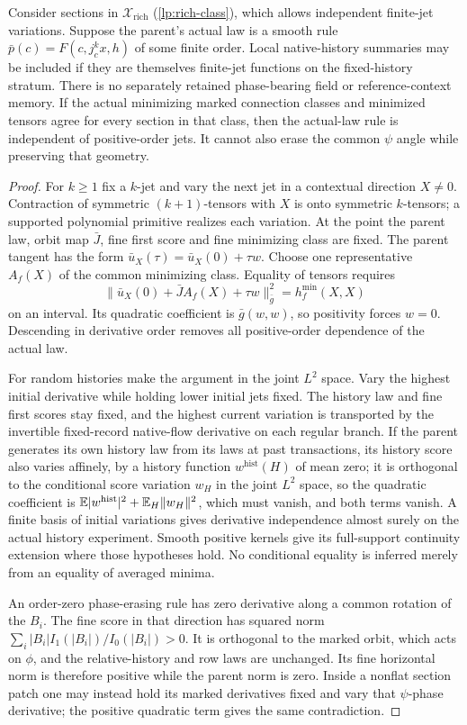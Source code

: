 Consider sections in $\mathcal X_{\mathrm{rich}}$ (\cref{lp:rich-class}), which allows independent finite-jet variations. Suppose the parent's actual law is a smooth rule $\bar p(c)=F(c,j_c^k x,h)$ of some finite order. Local native-history summaries may be included if they are themselves finite-jet functions on the fixed-history stratum. There is no separately retained phase-bearing field or reference-context memory. If the actual minimizing marked connection classes and minimized tensors agree for every section in that class, then the actual-law rule is independent of positive-order jets. It cannot also erase the common $\psi$ angle while preserving that geometry.
\begin{proof}
For $k\ge1$ fix a $k$-jet and vary the next jet in a contextual direction $X\ne0$. Contraction of symmetric $(k+1)$-tensors with $X$ is onto symmetric $k$-tensors; a supported polynomial primitive realizes each variation. At the point the parent law, orbit map $\bar J$, fine first score and fine minimizing class are fixed. The parent tangent has the form $\bar u_X(\tau)=\bar u_X(0)+\tau w$. Choose one representative $A_f(X)$ of the common minimizing class. Equality of tensors requires
\begin{equation}
 \|\bar u_X(0)+\bar J A_f(X)+\tau w\|_{\bar g}^2
 =h_f^{\min}(X,X)
 \label{lp:highest-jet}
\end{equation}
on an interval. Its quadratic coefficient is $\bar g(w,w)$, so positivity forces $w=0$. Descending in derivative order removes all positive-order dependence of the actual law.

For random histories make the argument in the joint $L^2$ space. Vary the highest initial derivative while holding lower initial jets fixed. The history law and fine first scores stay fixed, and the highest current variation is transported by the invertible fixed-record native-flow derivative on each regular branch. If the parent generates its own history law from its laws at past transactions, its history score also varies affinely, by a history function $w^{\mathrm{hist}}(H)$ of mean zero; it is orthogonal to the conditional score variation $w_H$ in the joint $L^2$ space, so the quadratic coefficient is $\mathbb E|w^{\mathrm{hist}}|^2+\mathbb E_H\|w_H\|^2$, which must vanish, and both terms vanish. A finite basis of initial variations gives derivative independence almost surely on the actual history experiment. Smooth positive kernels give its full-support continuity extension where those hypotheses hold. No conditional equality is inferred merely from an equality of averaged minima.

An order-zero phase-erasing rule has zero derivative along a common rotation of the $B_i$. The fine score in that direction has squared norm $\sum_i|B_i|I_1(|B_i|)/I_0(|B_i|)>0$. It is orthogonal to the marked orbit, which acts on $\phi$, and the relative-history and row laws are unchanged. Its fine horizontal norm is therefore positive while the parent norm is zero. Inside a nonflat section patch one may instead hold its marked derivatives fixed and vary that $\psi$-phase derivative; the positive quadratic term gives the same contradiction.
\end{proof}

